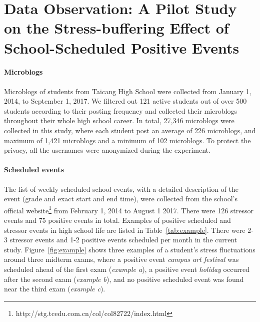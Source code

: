 \section{Data Observation: A Pilot Study on the Stress-buffering Effect of School-Scheduled Positive Events}
\label{sec:obs}
\paragraph{Microblogs} Microblogs of students from Taicang High School were collected from January 1, 2014, to September 1, 2017. 
We filtered out 121 active students out of over 500 students according to their posting frequency 
and collected their microblogs throughout their whole high school career. 
In total, 27,346 microblogs were collected in this study, 
where each student post an average of 226 microblogs, and maximum of 1,421 microblogs and a minimum of 102 microblogs. 
To protect the privacy, all the usernames were anonymized during the experiment. 

\paragraph{Scheduled events} The list of weekly scheduled school events, 
with a detailed description of the event (grade and exact start and end time), 
were collected from the school's official website\footnote{http://stg.tcedu.com.cn/col/col82722/index.html} 
from February 1, 2014 to August 1 2017. 
There were 126 stressor events and 75 positive events in total. 
Examples of positive scheduled and stressor events in high school life are listed in Table~\ref{tab:example}. 
There were 2-3 stressor events and 1-2 positive events scheduled per month in the current study. 
Figure~\ref{fig:example} shows three examples of a student's stress fluctuations around three midterm exams, 
where a positive event \emph{campus art festival} was scheduled ahead of the first exam (\emph{example a}), 
a positive event \emph{holiday} occurred after the second exam (\emph{example b}), 
and no positive scheduled event was found near the third exam (\emph{example c}). 


\begin{table}[H]
\caption{\small{Examples of school-scheduled positive and stressor events.}}
\label{tab:example}
\end{table}

